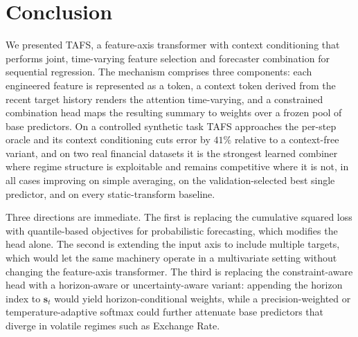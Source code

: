 \documentclass[journal]{IEEEtran}
\begin{document}
\section{Conclusion}
\label{sec:conclusion}

We presented TAFS, a feature-axis transformer with context conditioning that performs joint, time-varying feature selection and forecaster combination for sequential regression. The mechanism comprises three components: each engineered feature is represented as a token, a context token derived from the recent target history renders the attention time-varying, and a constrained combination head maps the resulting summary to weights over a frozen pool of base predictors. On a controlled synthetic task TAFS approaches the per-step oracle and its context conditioning cuts error by $41\%$ relative to a context-free variant, and on two real financial datasets it is the strongest learned combiner where regime structure is exploitable and remains competitive where it is not, in all cases improving on simple averaging, on the validation-selected best single predictor, and on every static-transform baseline.

Three directions are immediate. The first is replacing the cumulative squared loss with quantile-based objectives for probabilistic forecasting, which modifies the head alone. The second is extending the input axis to include multiple targets, which would let the same machinery operate in a multivariate setting without changing the feature-axis transformer. The third is replacing the constraint-aware head with a horizon-aware or uncertainty-aware variant: appending the horizon index to $\mathbf{s}_t$ would yield horizon-conditional weights, while a precision-weighted or temperature-adaptive softmax could further attenuate base predictors that diverge in volatile regimes such as Exchange Rate.

\end{document}
